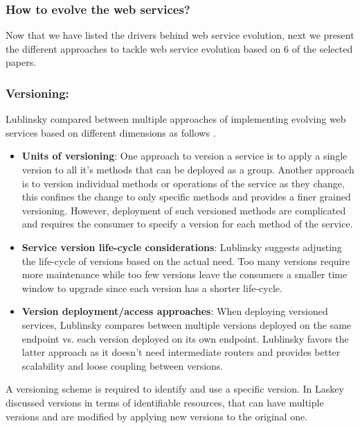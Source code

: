 \documentclass[runningheads,a4paper]{llncs}
\begin{document}


\subsubsection{How to evolve the web services?} %
\label{sub:how_to_evolve_the_web_services_}
Now that we have listed the drivers behind web service evolution, next we present the different approaches to tackle web service evolution based on 6 of the selected papers.

\subsubsection{Versioning:} %
Lublinsky compared between multiple approaches of implementing evolving web services based on different dimensions as follows \cite{lublinsky2007versioning}.

\begin{itemize}

  \item \textbf{Units of versioning}: One approach to version a service is to apply a single version to all it’s methods that can be deployed as a group. Another approach is to version individual methods or operations of the service as they change, this confines the change to only specific methods and provides a finer grained versioning. However, deployment of such versioned methods are complicated and requires the consumer to specify a version for each method of the service.
  \item \textbf{Service version life-cycle considerations}: Lublinsky suggests adjusting the life-cycle of versions based on the actual need. Too many versions require more maintenance while too few versions leave the consumers a smaller time window to upgrade since each version has a shorter life-cycle.
  \item \textbf{Version deployment/access approaches}: When deploying versioned services, Lublinsky compares between multiple versions deployed on the same endpoint vs. each version deployed on its own endpoint. Lublinsky favors the latter approach as it doesn't need intermediate routers and provides better scalability and loose coupling between versions.

\end{itemize}

A versioning scheme is required to identify and use a specific version. In \cite{laskey2008considerations} Laskey discussed versions in terms of identifiable resources, that can have multiple versions and are modified by applying new versions to the original one.
\end{document}
